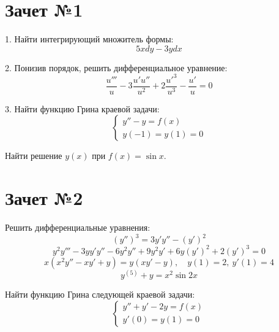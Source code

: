 \documentclass[a4paper]{article}
\newcommand{\No}{№}
\begin{document}
\section{Зачет \No 1}

1. Найти интегрирующий множитель формы:
$$
5xdy-3ydx
$$

2. Понизив порядок, решить дифференциальное уравнение:
$$
\frac{u'''}{u}-3\frac{u'u''}{u^2}+2\frac{u'^3}{u^3}-\frac{u'}{u}=0
$$

3. Найти функцию Грина краевой задачи:
$$
\begin{cases}
y''-y=f(x)\\
y(-1)=y(1)=0
\end{cases}
$$

Найти решение $y(x)$ при $f(x)=\sin x$.

\section{Зачет \No 2}

Решить дифференциальные уравнения:
$$
(y'')^3=3y'y''-(y')^2
$$
$$
y^2y'''-3yy'y''-6y^2y''+9y^2y'+6y(y')^2+2(y')^3=0
$$
$$
x(x^2y''-xy'+y)=y(xy'-y),\quad y(1)=2,\ y'(1)=4
$$
$$
y^{(5)}+y=x^2\sin 2x
$$

Найти функцию Грина следующей краевой задачи:
$$
\begin{cases}
y''+y'-2y=f(x)\\
y'(0)=y(1)=0
\end{cases}
$$
\end{document}
